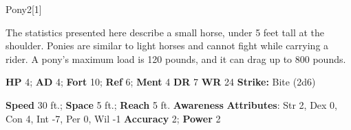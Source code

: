   \begin{monsection}{Pony}{2}[1]
    \vspace{-1em}\vspace{-1em}
    \vspace{0em}

    
      The statistics presented here describe a small horse, under 5 feet tall at the shoulder.
      Ponies are similar to light horses and cannot fight while carrying a rider.
      A pony's maximum load is 120 pounds, and it can drag up to 800 pounds.
    

    \begin{spellcontent}
      \begin{spelltargetinginfo}
        \pari \textbf{HP} 4;
          \textbf{AD} 4;
          \textbf{Fort} 10;
          \textbf{Ref} 6;
          \textbf{Ment} 4
        \pari \textbf{DR} 7
        \pari \textbf{WR} 24
        \pari \textbf{Strike:}
            Bite  (2d6)
      \end{spelltargetinginfo}
    \end{spellcontent}
    \begin{monsterfooter}
      \pari \textbf{Speed} 30 ft.;
        \textbf{Space} 5 ft.;
        \textbf{Reach} 5 ft.
      \pari \textbf{Awareness} 
      \pari \textbf{Attributes}:
        Str 2, Dex 0,
        Con 4, Int -7,
        Per 0, Wil -1
      \pari \textbf{Accuracy} 2;
        \textbf{Power} 2
    \end{monsterfooter}
  \end{monsection}
  
